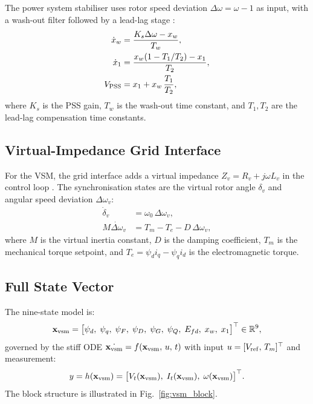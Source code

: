 \documentclass[journal]{IEEEtran}
\newcommand{\Efd}{E_{fd}}
\newcommand{\Vpss}{V_{\rm PSS}}
\newcommand{\Vt}{V_t}
\newcommand{\xvsm}{\mathbf{x}_{\rm vsm}}
\begin{document}
The power system stabiliser uses rotor speed deviation
$\Delta\omega = \omega - 1$ as input, with a wash-out filter
followed by a lead-lag stage \cite{Kundur1994,Demello1969}:
\begin{align}
  \dot{x}_w &= \frac{K_s\Delta\omega - x_w}{T_w},  \label{eq:xw}\\
  \dot{x}_1 &= \frac{x_w(1 - T_1/T_2) - x_1}{T_2},\label{eq:x1}\\
  \Vpss      &= x_1 + x_w\,\frac{T_1}{T_2},        \label{eq:Vpss}
\end{align}
where $K_s$ is the PSS gain, $T_w$ is the wash-out time constant,
and $T_1, T_2$ are the lead-lag compensation time constants.

\subsection{Virtual-Impedance Grid Interface}

For the VSM, the grid interface adds a virtual impedance
$Z_v = R_v + j\omega L_v$ in the control loop \cite{Zhong2011VSM}.
The synchronisation states are the virtual rotor angle $\delta_v$
and angular speed deviation $\Delta\omega_v$:
\begin{align}
  \dot{\delta}_v    &= \omega_0\,\Delta\omega_v,            \label{eq:deltav}\\
  M\dot{\Delta\omega}_v &= T_m - T_e - D\,\Delta\omega_v,  \label{eq:omegav}
\end{align}
where $M$ is the virtual inertia constant, $D$ is the damping
coefficient, $T_m$ is the mechanical torque setpoint, and
$T_e = \psi_d i_q - \psi_q i_d$ is the electromagnetic torque.

\subsection{Full State Vector}

The nine-state model is:
\begin{equation}
  \xvsm = \bigl[\psi_d,\;\psi_q,\;\psi_F,\;\psi_D,\;\psi_G,\;\psi_Q,\;
                \Efd,\;x_w,\;x_1\bigr]^\top \in \mathbb{R}^9,
  \label{eq:statevec}
\end{equation}
governed by the stiff ODE
$\dot{\xvsm} = f(\xvsm,\,u,\,t)$
with input $u = [V_{\rm ref},\,T_m]^\top$ and measurement:
\begin{equation}
  y = h(\xvsm) = \bigl[\Vt(\xvsm),\;I_t(\xvsm),\;\omega(\xvsm)\bigr]^\top.
  \label{eq:meas}
\end{equation}
The block structure is illustrated in Fig.~\ref{fig:vsm_block}.
\end{document}
